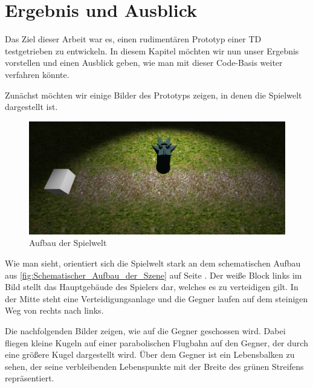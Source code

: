 \chapter{Ergebnis und Ausblick}

Das Ziel dieser Arbeit war es, einen rudimentären Prototyp einer TD testgetrieben zu entwickeln. In diesem Kapitel möchten wir nun unser Ergebnis vorstellen und einen Ausblick geben, wie man mit dieser Code-Basis weiter verfahren könnte.

Zunächst möchten wir einige Bilder des Prototyps zeigen, in denen die Spielwelt dargestellt ist.\\

\begin{figure}[h]
\centering
\includegraphics[width=1\linewidth]{./images/Kapitel_Ergebnis_und_Ausblick/Aufbau_der_Szene}
\caption[Aufbau der Spielwelt]{Aufbau der Spielwelt}
\label{fig:Aufbau_der_Szene}
\end{figure}

Wie man sieht, orientiert sich die Spielwelt stark an dem schematischen Aufbau aus \autoref{fig:Schematischer_Aufbau_der_Szene} auf Seite \pageref{fig:Schematischer_Aufbau_der_Szene}. Der weiße Block links im Bild stellt das Hauptgebäude des Spielers dar, welches es zu verteidigen gilt. In der Mitte steht eine Verteidigungsanlage und die Gegner laufen auf dem steinigen Weg von rechts nach links.
\pagebreak

Die nachfolgenden Bilder zeigen, wie auf die Gegner geschossen wird. Dabei fliegen kleine Kugeln auf einer parabolischen Flugbahn auf den Gegner, der durch eine größere Kugel dargestellt wird. Über dem Gegner ist ein Lebensbalken zu sehen, der seine verbleibenden Lebenspunkte mit der Breite des grünen Streifens repräsentiert.\\

